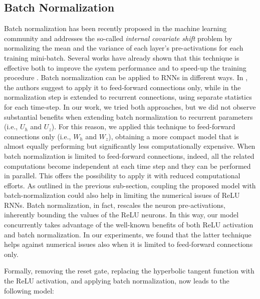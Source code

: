 \documentclass[journal]{IEEEtran}
\begin{document}
\subsection{Batch Normalization} \label{sec:bn}
Batch normalization \cite{batchnorm} has been recently proposed in the machine learning community and addresses the so-called \textit{internal covariate shift} problem by normalizing the mean and the variance of each layer's pre-activations for each training mini-batch. Several works have already shown that this technique is effective both to improve the system performance and to speed-up the training procedure \cite{cesar,tim,baidu,ravanelli_SLT,ravanelli_icassp}. Batch normalization can be applied to RNNs in different ways. In \cite{cesar}, the authors suggest to apply it to feed-forward connections only, while in \cite{tim} the normalization step is extended to recurrent connections, using separate statistics for each time-step.  In our work, we tried both approaches, but  we did not observe substantial benefits when extending batch normalization to recurrent parameters (i.e., $U_{h}$ and $U_{z}$).  For this reason, we applied this technique to feed-forward connections only (i.e., $W_{h}$ and $W_{z}$), obtaining a more compact model that is almost equally performing but significantly less computationally expensive. When batch normalization is limited to feed-forward connections, indeed, all the related computations become independent at each time step and they can be performed in parallel. This offers the possibility to apply it with reduced computational efforts.  As outlined in the previous sub-section, coupling the proposed model with batch-normalization \cite{batchnorm} could also help in limiting the numerical issues of ReLU RNNs. Batch normalization, in fact, rescales the neuron pre-activations, inherently bounding the values of the ReLU neurons. 
In this way, our model concurrently takes advantage of the well-known benefits of both ReLU activation and batch normalization.
In our experiments, we found that the latter technique helps against numerical issues also when it is limited to feed-forward connections only.

Formally, removing the reset gate, replacing the hyperbolic tangent function with the ReLU activation, and applying batch normalization, now leads to the following model:
\end{document}
